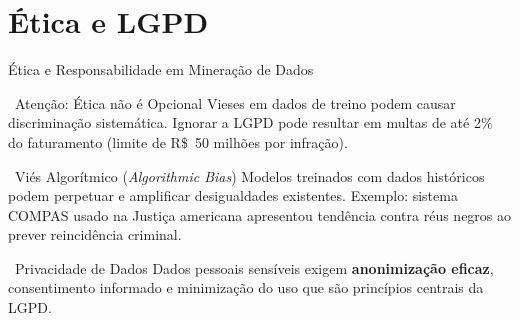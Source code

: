 \documentclass[aspectratio=169]{beamer}
\begin{document}
\section{Ética e LGPD}

\begin{frame}{Ética e Responsabilidade em Mineração de Dados}
    \begin{alertblock}{\faWarning\ Atenção: Ética não é Opcional}
        Vieses em dados de treino podem causar discriminação sistemática. Ignorar a LGPD pode resultar em multas de até 2\% do faturamento (limite de R\$~50 milhões por infração).
    \end{alertblock}
    \vspace{0.2cm}
    \begin{block}{\faBalanceScale\ Viés Algorítmico (\textit{Algorithmic Bias})}
        Modelos treinados com dados históricos podem perpetuar e amplificar desigualdades existentes. Exemplo: sistema COMPAS usado na Justiça americana apresentou tendência contra réus negros ao prever reincidência criminal.
    \end{block}
    \vspace{0.15cm}
    \begin{block}{\faLock\ Privacidade de Dados}
        Dados pessoais sensíveis exigem \textbf{anonimização eficaz}, consentimento informado e minimização do uso que são princípios centrais da LGPD.
    \end{block}
\end{frame}
\end{document}
